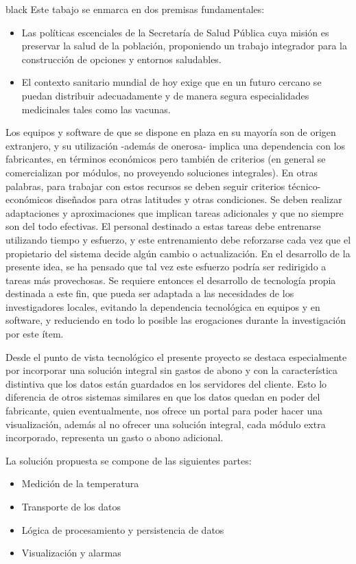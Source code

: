 \documentclass[11pt]{charter}
\begin{document}
\begin{consigna}{black}
Este tabajo se enmarca en dos premisas fundamentales:
\begin{itemize}
\item Las políticas escenciales de la Secretaría de Salud Pública cuya misión es preservar la salud de la población, proponiendo un trabajo integrador para la construcción de opciones y entornos saludables.
\item El contexto sanitario mundial de hoy exige que en un futuro cercano se puedan distribuir adecuadamente y de manera segura especialidades medicinales tales como las vacunas.
\end{itemize}
Los equipos y software de que se dispone en plaza en su mayoría son de origen extranjero, y su utilización -además de onerosa- implica una dependencia con los fabricantes, en términos económicos pero también de criterios (en general se comercializan por módulos, no proveyendo soluciones integrales). En otras palabras, para trabajar con estos recursos se deben seguir criterios técnico-económicos diseñados para otras latitudes y otras condiciones. Se deben realizar adaptaciones y aproximaciones que implican tareas adicionales y que no siempre son del todo efectivas. El personal destinado a estas tareas debe entrenarse utilizando tiempo y esfuerzo, y este entrenamiento debe reforzarse cada vez que el propietario del sistema decide algún cambio o actualización. En el desarrollo de la presente idea, se ha pensado que tal vez este esfuerzo podría ser redirigido a tareas más provechosas.
Se requiere entonces el desarrollo de tecnología propia destinada a este fin, que pueda ser adaptada a las necesidades de los investigadores locales, evitando la dependencia tecnológica en equipos y en software, y reduciendo en todo lo posible las erogaciones durante la investigación por este ítem.

Desde el punto de vista tecnológico el presente proyecto se destaca especialmente por incorporar una solución integral sin gastos de abono y con la característica distintiva que los datos están guardados en los servidores del cliente. Esto lo diferencia de otros sistemas similares en que los datos quedan en poder del fabricante, quien eventualmente, nos ofrece un portal para poder hacer una visualización, además al no ofrecer una solución integral, cada módulo extra incorporado, representa un gasto o abono adicional. 

La solución propuesta se compone de las siguientes partes:
\begin{itemize}
\item Medición de la temperatura
\item Transporte de los datos
\item Lógica de procesamiento y persistencia de datos
\item Visualización y alarmas
\end{itemize}



\end{consigna}
\end{document}
